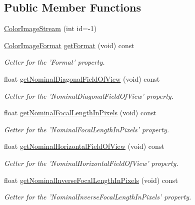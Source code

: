 \subsection*{\-Public \-Member \-Functions}
\begin{DoxyCompactItemize}
\item 
\hyperlink{class_color_image_stream_a97cddde602ba1fe7c79a946c1014b474}{\-Color\-Image\-Stream} (int id=-\/1)
\item 
\hyperlink{color_image_format_8h_a77f719572c3c368859dd2ec3153d8452}{\-Color\-Image\-Format} \hyperlink{class_color_image_stream_ac3c758917fcba0834dbbffa8d665bf2f}{get\-Format} (void) const 
\begin{DoxyCompactList}\small\item\em \-Getter for the '\-Format' property. \end{DoxyCompactList}\item 
float \hyperlink{class_color_image_stream_a708f4a47fe80d448265be8e270e1e50f}{get\-Nominal\-Diagonal\-Field\-Of\-View} (void) const 
\begin{DoxyCompactList}\small\item\em \-Getter for the '\-Nominal\-Diagonal\-Field\-Of\-View' property. \end{DoxyCompactList}\item 
float \hyperlink{class_color_image_stream_a7e26bad84bbd1da265af899d7961dc84}{get\-Nominal\-Focal\-Length\-In\-Pixels} (void) const 
\begin{DoxyCompactList}\small\item\em \-Getter for the '\-Nominal\-Focal\-Length\-In\-Pixels' property. \end{DoxyCompactList}\item 
float \hyperlink{class_color_image_stream_a1d024838ae7e09db2613d304f30663bc}{get\-Nominal\-Horizontal\-Field\-Of\-View} (void) const 
\begin{DoxyCompactList}\small\item\em \-Getter for the '\-Nominal\-Horizontal\-Field\-Of\-View' property. \end{DoxyCompactList}\item 
float \hyperlink{class_color_image_stream_ad021051c7bc0e3ac3f5ba8c3727b018d}{get\-Nominal\-Inverse\-Focal\-Length\-In\-Pixels} (void) const 
\begin{DoxyCompactList}\small\item\em \-Getter for the '\-Nominal\-Inverse\-Focal\-Length\-In\-Pixels' property. \end{DoxyCompactList}\item 

\end{DoxyCompactItemize}
